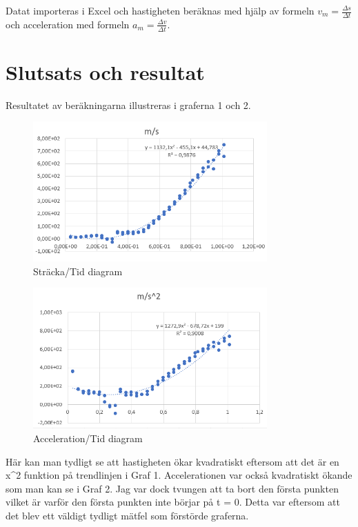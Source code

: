 \documentclass[11p, titlepage, oneside, a4paper]{article}
\begin{document}
    Datat importeras i Excel och hastigheten beräknas med hjälp av formeln $v_m = \frac{\Delta s}{\Delta t}$ och acceleration med formeln $a_m = \frac{\Delta v}{\Delta t}$.
    
    \section{Slutsats och resultat} 
        Resultatet av beräkningarna illustreras i graferna 1 och 2.

        \begin{figure}[!h]
            \includegraphics[width=0.8\textwidth]{images/graph 1.png}
            \caption{Sträcka/Tid diagram}
            \label{fig:Graf 1}
        \end{figure}

        \begin{figure}[!h]
            \includegraphics[width=0.8\textwidth]{images/graph 2.png}
            \caption{Acceleration/Tid diagram}
            \label{fig:Graf 2}
        \end{figure}

        Här kan man tydligt se att hastigheten ökar kvadratiskt eftersom att det är en x^2 funktion på trendlinjen i Graf 1. Accelerationen var också kvadratiskt ökande som man kan se i Graf 2. Jag var dock tvungen att ta bort den första punkten vilket är varför den första punkten inte börjar på t = 0. Detta var eftersom att det blev ett väldigt tydligt mätfel som förstörde graferna.
\end{document}
